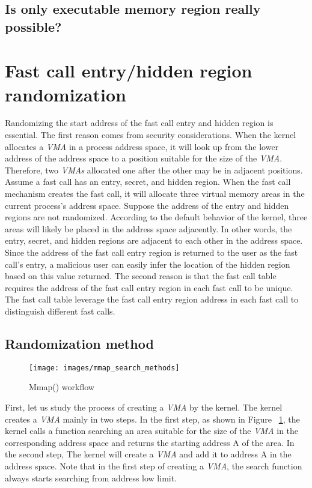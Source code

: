 \subsection{Is only executable memory region really possible?}


\section{Fast call entry/hidden region randomization}


Randomizing the start address of the fast call entry and hidden region is essential.
The first reason comes from security considerations. When the kernel allocates a 
\emph{VMA} in a process address space, it will look up from the lower address of the address 
space to a position suitable for the size of the \emph{VMA}. Therefore, two \emph{VMAs} 
allocated one after the other may be in adjacent positions. Assume a fast 
call has an entry, secret, and hidden region. When the fast call mechanism 
creates the fast call, it will allocate three virtual memory areas in the current 
process's address space. Suppose the address of the entry and hidden regions are 
not randomized. According to the default behavior of the kernel, three areas will 
likely be placed in the address space adjacently. In other words, the entry, secret,
and hidden regions are adjacent to each other in the address space. Since the address 
of the fast call entry region is returned to the user as the fast call's entry, 
a malicious user can easily infer the location of the hidden region based on this value returned.
The second reason is that the fast call table requires the address of the 
fast call entry region in each fast call to be unique. The fast call table 
leverage the fast call entry region address in each fast call to distinguish
different fast calls.

\subsection{Randomization method}
\begin{figure}[tbp]
  \centering
  \texttt{[image: images/mmap\_search\_methods]}
  \caption[Short description]{Mmap() workflow}
  \label{fig:mmap_search_methods}
\end{figure}

First, let us study the process of creating a \emph{VMA} by the kernel. 
The kernel creates a \emph{VMA} mainly in two steps. In the first step, as shown in Figure ~\ref{fig:mmap_search_methods}, the kernel calls 
a function searching an area suitable for the size of the \emph{VMA}  in the corresponding 
address space and returns the starting address A of the area. In the second step, 
The kernel will create a \emph{VMA} and add it to address A in the address space.  
Note that in the first step of creating a \emph{VMA}, the search 
function always starts searching from address low limit.

